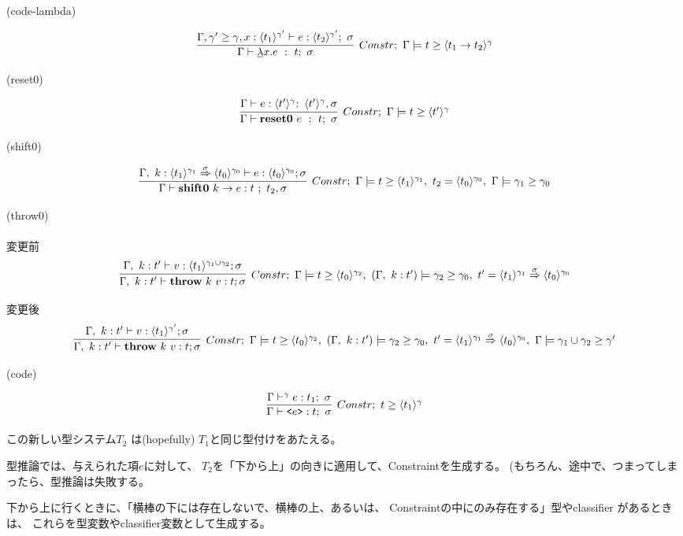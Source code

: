 (code-lambda)

\[
  \infer[Constr;~\Gamma \models \longer{t}{\codeT{t_1 \to t_2}{\gamma}}]
  {\Gamma \vdash \underline{\lambda}x.e ~:~t;~\sigma}
  {\Gamma,\longer{\gamma'}{\gamma},x:\codeT{t_1}{\gamma'}
    \vdash e : \codeT{t_2}{\gamma'};~\sigma
  }
\]

(reset0)

\[
  \infer[Constr;~\Gamma \models \longer{t}{\codeT{t'}{\gamma}}]
  {\Gamma \vdash \Resetz~e ~:~ t; ~\sigma}
  {\Gamma \vdash e:\codeT{t'}{\gamma};~\codeT{t'}{\gamma},\sigma
  }
\]

(shift0)

\[
  \infer[Constr;~\Gamma \models \longer{t}{\codeT{t_1}{\gamma_1}},~ t_2 =\codeT{t_0}{\gamma_0},~ \Gamma \models \longer{\gamma_1}{\gamma_0}]
  {\Gamma \vdash \shiftz{k}{e} : t~;~ t_2,\sigma}
  {\Gamma,~k:\contT{\codeT{t_1}{\gamma_1}}{\codeT{t_0}{\gamma_0}}{\sigma}
    \vdash e : \codeT{t_0}{\gamma_0} ; \sigma
  }
\]


(throw0)\\
\\
変更前
\[
  \infer[Constr;~ \Gamma \models \longer{t}{\codeT{t_0}{\gamma_2}},~ (\Gamma,~ k:t') \models \gamma_2 \ord \gamma_0,~  t' = \contT{\codeT{t_1}{\gamma_1}}{\codeT{t_0}{\gamma_0}}{\sigma}]
  {\Gamma,~ k:t'
    \vdash \throw{k}{v} : t ; \sigma}
  {\Gamma,~ k:t'
    \vdash v : \codeT{t_1}{\gamma_1 \uni \gamma_2} ; \sigma
  }
\]

変更後
\[
  \infer[Constr;~ \Gamma \models \longer{t}{\codeT{t_0}{\gamma_2}},~ (\Gamma,~ k:t') \models \gamma_2 \ord \gamma_0,~  t' = \contT{\codeT{t_1}{\gamma_1}}{\codeT{t_0}{\gamma_0}}{\sigma},~ \Gamma \models \gamma_1 \uni \gamma_2 \ord \gamma']
  {\Gamma,~ k:t'
    \vdash \throw{k}{v} : t ; \sigma}
  {\Gamma,~ k:t'
    \vdash v : \codeT{t_1}{\gamma'} ; \sigma
  }
\]

(code)

\[
  \infer[Constr;~\longer{t}{\codeT{t_1}{\gamma}}]
  {\Gamma \vdash \code{e} : t;~\sigma}
  {\Gamma \vdash^\gamma e : t_1;~\sigma}
\]


この新しい型システム$T_2$ は(hopefully) $T_1$と同じ型付けをあたえる。

型推論では、与えられた項$e$に対して、
$T_2$を「下から上」の向きに適用して、Constraintを生成する。
(もちろん、途中で、つまってしまったら、型推論は失敗する。

下から上に行くときに、「横棒の下には存在しないで、横棒の上、あるいは、
Constraintの中にのみ存在する」型やclassifier があるときは、
これらを型変数やclassifier変数として生成する。

